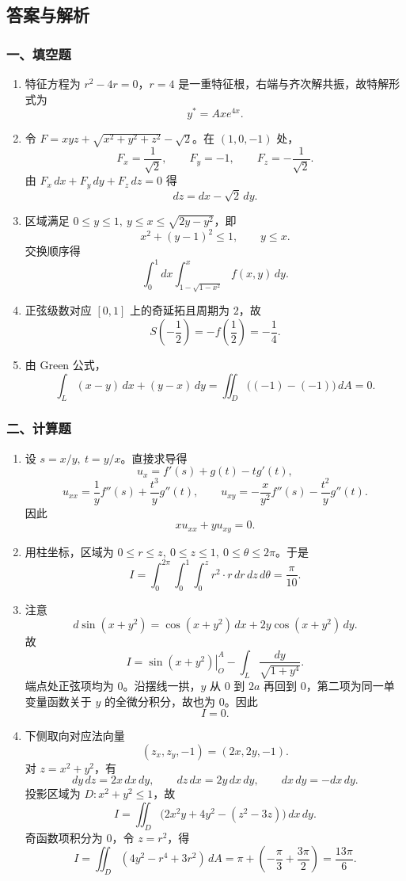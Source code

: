 \subsection{答案与解析}

\subsubsection*{一、填空题}
\begin{enumerate}
  \item 特征方程为 $r^2-4r=0$，$r=4$ 是一重特征根，右端与齐次解共振，故特解形式为
  \[
  y^*=Axe^{4x}.
  \]
  \item 令 $F=xyz+\sqrt{x^2+y^2+z^2}-\sqrt2$。在 $(1,0,-1)$ 处，
  \[
  F_x=\frac1{\sqrt2},\qquad F_y=-1,\qquad F_z=-\frac1{\sqrt2}.
  \]
  由 $F_x\,dx+F_y\,dy+F_z\,dz=0$ 得
  \[
  dz=dx-\sqrt2\,dy.
  \]
  \item 区域满足 $0\le y\le1,\ y\le x\le\sqrt{2y-y^2}$，即
  \[
  x^2+(y-1)^2\le1,\qquad y\le x.
  \]
  交换顺序得
  \[
  \int_0^1dx\int_{1-\sqrt{1-x^2}}^x f(x,y)\,dy.
  \]
  \item 正弦级数对应 $[0,1]$ 上的奇延拓且周期为 $2$，故
  \[
  S\!\left(-\frac12\right)=-f\!\left(\frac12\right)=-\frac14.
  \]
  \item 由 Green 公式，
  \[
  \int_L(x-y)\,dx+(y-x)\,dy
  =\iint_D\bigl((-1)-(-1)\bigr)\,dA=0.
  \]
\end{enumerate}

\subsubsection*{二、计算题}
\begin{enumerate}
  \item 设 $s=x/y,\ t=y/x$。直接求导得
  \[
  u_x=f'(s)+g(t)-tg'(t),
  \]
  \[
  u_{xx}=\frac1y f''(s)+\frac{t^3}{y}g''(t),\qquad
  u_{xy}=-\frac{x}{y^2}f''(s)-\frac{t^2}{y}g''(t).
  \]
  因此
  \[
  xu_{xx}+yu_{xy}=0.
  \]
  \item 用柱坐标，区域为 $0\le r\le z,\ 0\le z\le1,\ 0\le\theta\le2\pi$。于是
  \[
  I=\int_0^{2\pi}\int_0^1\int_0^z r^2\cdot r\,dr\,dz\,d\theta
  =\frac{\pi}{10}.
  \]
  \item 注意
  \[
  d\sin(x+y^2)=\cos(x+y^2)\,dx+2y\cos(x+y^2)\,dy.
  \]
  故
  \[
  I=\left.\sin(x+y^2)\right|_{O}^{A}-\int_L\frac{dy}{\sqrt{1+y^4}}.
  \]
  端点处正弦项均为 $0$。沿摆线一拱，$y$ 从 $0$ 到 $2a$ 再回到 $0$，第二项为同一单变量函数关于 $y$ 的全微分积分，故也为 $0$。因此
  \[
  I=0.
  \]
  \item 下侧取向对应法向量
  \[
  (z_x,z_y,-1)=(2x,2y,-1).
  \]
  对 $z=x^2+y^2$，有
  \[
  dy\,dz=2x\,dx\,dy,\qquad dz\,dx=2y\,dx\,dy,\qquad dx\,dy=-dx\,dy.
  \]
  投影区域为 $D:x^2+y^2\le1$，故
  \[
  I=\iint_D\bigl(2x^2y+4y^2-(z^2-3z)\bigr)\,dx\,dy.
  \]
  奇函数项积分为 $0$，令 $z=r^2$，得
  \[
  I=\iint_D(4y^2-r^4+3r^2)\,dA
  =\pi+\left(-\frac{\pi}{3}+\frac{3\pi}{2}\right)
  =\frac{13\pi}{6}.
  \]
\end{enumerate}

